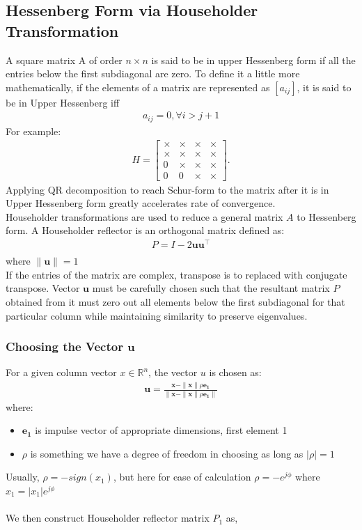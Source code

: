 \documentclass[12pt]{article}
\begin{document}
\subsection{Hessenberg Form via Householder Transformation}
A square matrix A of order $n \times n$ is said to be in upper Hessenberg form if all the entries below the first subdiagonal are zero. To define it a little more mathematically, if the elements of a matrix are represented as $[a_{ij}]$, it is said to be in Upper Hessenberg iff 
\begin{align*}
    a_{ij}=0,  \forall i>j+1
\end{align*}
For example:
\begin{align*}
H = \begin{bmatrix}
\times & \times & \times & \times \\
\times & \times & \times & \times \\
0 & \times & \times & \times \\
0 & 0 & \times & \times
\end{bmatrix}.
\end{align*}
Applying QR decomposition to reach Schur-form to the matrix after it is in Upper Hessenberg form greatly accelerates rate of convergence.\\
Householder transformations are used to reduce a general matrix $A$ to Hessenberg form. A Householder reflector is an orthogonal matrix defined as:
\begin{align*}
P = I - 2\textbf{uu}^{\top} \\
\end{align*}
where $\|\textbf{u}\|=1$\\
If the entries of the matrix are complex, transpose is to replaced with conjugate transpose.
Vector $\textbf{u}$ must be carefully chosen such that the resultant matrix $P$ obtained from it must zero out all elements below the first subdiagonal for that particular column while maintaining similarity to preserve eigenvalues.

\subsubsection{Choosing the Vector $\mathbf{u}$}

For a given column vector $x \in \mathbb{R}^n$, the vector $u$ is chosen as:
\begin{align*}
\mathbf{u} = \frac{\mathbf{x} - \|\mathbf{x}\| \rho \mathbf{e_1}}{\|\mathbf{x} - \|\mathbf{x}\| \rho \mathbf{e_1}\|}
\end{align*}
where:
\begin{itemize}
    \item $\mathbf{e_1}$ is impulse vector of appropriate dimensions, first element 1
    \item $\rho$ is something we have a degree of freedom in choosing as long as $|\rho|=1$
\end{itemize}
Usually, $\rho=-sign(x_1)$, but here for ease of calculation $\rho= -e^{j\phi}$ where $x_1=|x_1| e^{j\phi}$\\\\
We then construct Householder reflector matrix $P_1$ as,
\end{document}
